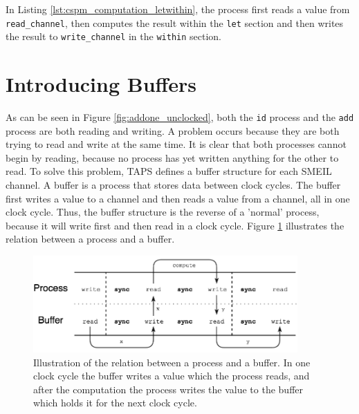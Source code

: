In Listing \ref{lst:cspm_computation_letwithin}, the process first reads a value from \texttt{read\_channel}, then computes the result within the \texttt{let} section and then writes the result to \texttt{write\_channel} in the \texttt{within} section.
\section{Introducing Buffers}
As can be seen in Figure \ref{fig:addone_unclocked}, both the \texttt{id} process and the \texttt{add} process are both reading and writing. A problem occurs because they are both trying to read and write at the same time. It is clear that both processes cannot begin by reading, because no process has yet written anything for the other to read.
To solve this problem, TAPS defines a buffer structure for each SMEIL channel. A buffer is a process that stores data between clock cycles. The buffer first writes a value to a channel and then reads a value from a channel, all in one clock cycle. Thus, the buffer structure is the reverse of a 'normal' process, because it will write first and then read in a clock cycle. Figure \ref{fig:clock_cycle} illustrates the relation between a process and a buffer.\\

\begin{figure}
\centering
\includegraphics[width=0.90\textwidth]{./figures/clock_cycle_thesis.png}
\caption{Illustration of the relation between a process and a buffer. In one clock cycle the buffer writes a value which the process reads, and after the computation the process writes the value to the buffer which holds it for the next clock cycle.}
\label{fig:clock_cycle}
\end{figure}


